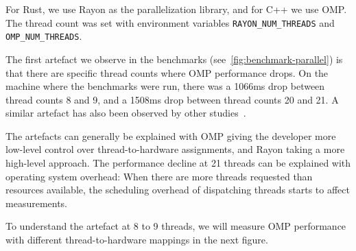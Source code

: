 \documentclass[11pt,
               a4paper,
               bibtotoc,
               idxtotoc,
               headsepline,
               footsepline,
               footexclude,
               BCOR12mm,
               DIV13,
               openany,   %
               ]
               {scrbook}
\begin{document}
For Rust, we use Rayon as the parallelization library, and for C++ we use OMP. The thread count was set with environment variables \texttt{RAYON\_NUM\_THREADS} and \texttt{OMP\_NUM\_THREADS}.

The first artefact we observe in the benchmarks (see~\ref{fig:benchmark-parallel}) is that there are specific thread counts where OMP performance drops. On the machine where the benchmarks were run, there was a 1066ms drop between thread counts 8 and 9, and a 1508ms drop between thread counts 20 and 21. A similar artefact has also been observed by other studies~\cite{rust-rayon-carnegie-mellon-university}.

The artefacts can generally be explained with OMP giving the developer more low-level control over thread-to-hardware assignments, and Rayon taking a more high-level approach. The performance decline at 21 threads can be explained with operating system overhead: When there are more threads requested than resources available, the scheduling overhead of dispatching threads starts to affect measurements.

To understand the artefact at 8 to 9 threads, we will measure OMP performance with different thread-to-hardware mappings in the next figure.





\end{document}
